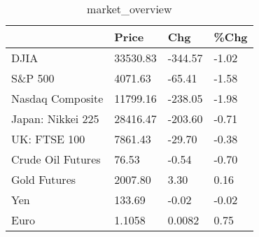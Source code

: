 \documentclass{article}%
\begin{document}
%


\begin{table}[htbp]%
\caption{market\_overview}%
\centering%
\begin{adjustbox}{width=1\textwidth}%
\begin{tabular}{llll}
\toprule
                  &    Price &     Chg &  \%Chg \\
\midrule
             DJIA & 33530.83 & -344.57 & -1.02 \\
          S\&P 500 &  4071.63 &  -65.41 & -1.58 \\
 Nasdaq Composite & 11799.16 & -238.05 & -1.98 \\
Japan: Nikkei 225 & 28416.47 & -203.60 & -0.71 \\
     UK: FTSE 100 &  7861.43 &  -29.70 & -0.38 \\
Crude Oil Futures &    76.53 &   -0.54 & -0.70 \\
     Gold Futures &  2007.80 &    3.30 &  0.16 \\
              Yen &   133.69 &   -0.02 & -0.02 \\
             Euro &   1.1058 &  0.0082 &  0.75 \\
\bottomrule
\end{tabular}
%
\end{adjustbox}%
\end{table}

%
\end{document}
